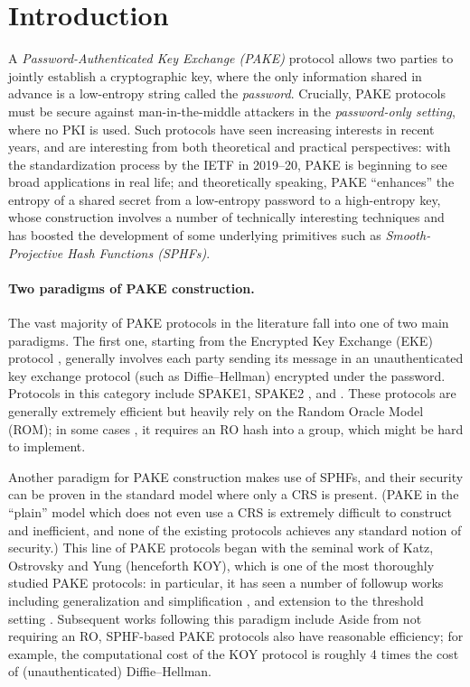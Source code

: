 \section{Introduction}
A \emph{Password-Authenticated Key Exchange (PAKE)} protocol allows two parties to jointly establish a cryptographic key, where the only information shared in advance is a low-entropy string called the \emph{password}. Crucially, PAKE protocols must be secure against man-in-the-middle attackers in the \emph{password-only setting}, where no PKI is used. Such protocols have seen increasing interests in recent years, and are interesting from both theoretical and practical perspectives: with the standardization process by the IETF in 2019--20, PAKE is beginning to see broad applications in real life; and theoretically speaking, PAKE ``enhances'' the entropy of a shared secret from a low-entropy password to a high-entropy key, whose construction involves a number of technically interesting techniques and has boosted the development of some underlying primitives such as \emph{Smooth-Projective Hash Functions (SPHFs)}.

\paragraph{Two paradigms of PAKE construction.}
The vast majority of PAKE protocols in the literature fall into one of two main paradigms. The first one, starting from the Encrypted Key Exchange (EKE) protocol \cite{SP:BelMer92}, generally involves each party sending its message in an unauthenticated key exchange protocol (such as Diffie--Hellman) encrypted under the password. Protocols in this category include SPAKE1, SPAKE2 \cite{RSA:AbdPoi05}, and . These protocols are generally extremely efficient but heavily rely on the Random Oracle Model (ROM); in some cases \cite{SP:BelMer92}, it requires an RO hash into a group, which might be hard to implement.

Another paradigm for PAKE construction makes use of SPHFs, and their security can be proven in the standard model where only a CRS is present. (PAKE in the ``plain'' model which does not even use a CRS is extremely difficult to construct and inefficient, and none of the existing protocols \cite{...} achieves any standard notion of security.) This line of PAKE protocols began with the seminal work of Katz, Ostrovsky and Yung \cite{EC:KatOstYun01} (henceforth KOY), which is one of the most thoroughly studied PAKE protocols: in particular, it has seen a number of followup works including generalization \cite{EC:GenLin03} and simplification \cite{PKC:AbdBenPoi15}, and extension to the threshold setting \cite{...}. Subsequent works following this paradigm include \cite{...} Aside from not requiring an RO, SPHF-based PAKE protocols also have reasonable efficiency; for example, the computational cost of the KOY protocol is roughly 4 times the cost of (unauthenticated) Diffie--Hellman.

